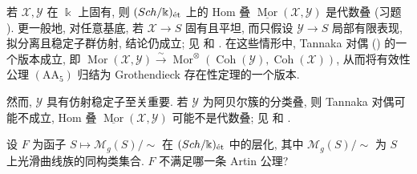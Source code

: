 \begin{example}[Hom 叠]\label{src:C.7.20}
若 $\mathcal X,\mathcal Y$ 在 $\Bbbk$ 上固有, 则 $(Sch/\Bbbk)_{\text{ét}}$ 上的 Hom 叠 $\underline{\operatorname{Mor}}(\mathcal X,\mathcal Y)$ 是代数叠 (习题 ). 更一般地, 对任意基底, 若 $\mathcal X\to S$ 固有且平坦, 而只假设 $\mathcal Y\to S$ 局部有限表现, 拟分离且稳定子群仿射, 结论仍成立; 见 \cite[定理 $1.2$]{HR19b} 和 \cite[推论 $1.6$]{BHL17}. 在这些情形中, Tannaka 对偶 () 的一个版本成立, 即 $\operatorname{Mor}(\mathcal X,\mathcal Y)\xrightarrow\sim\operatorname{Mor}^{\otimes}(\operatorname{Coh}(\mathcal Y),\operatorname{Coh}(\mathcal X))$, 从而将有效性公理 $(\mathrm{AA}_5)$ 归结为 Grothendieck 存在性定理的一个版本.

然而, $\mathcal Y$ 具有仿射稳定子至关重要. 若 $\mathcal Y$ 为阿贝尔簇的分类叠, 则 Tannaka 对偶可能不成立, Hom 叠 $\underline{\operatorname{Mor}}(\mathcal X,\mathcal Y)$ 可能不是代数叠; 见 \cite[Tag 0AF8]{SP} 和 \cite[\S$10$]{HR19b}.
\end{example}
\begin{exercise}[光滑曲线函子的层化]\label{src:C.7.21}
设 $F$ 为函子 $S\mapsto\mathcal M_g(S)/{\sim}$ 在 $(Sch/\Bbbk)_{\text{ét}}$ 中的层化, 其中 $\mathcal M_g(S)/{\sim}$ 为 $S$ 上光滑曲线族的同构类集合. $F$ 不满足哪一条 Artin 公理?
\end{exercise}
